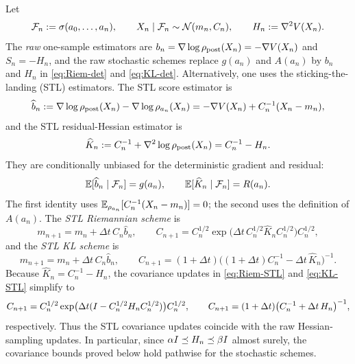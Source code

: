 Let
\[
    \mathcal{F}_n:=\sigma(a_0,\ldots,a_n),
    \qquad
    X_n\mid\mathcal{F}_n\sim\mathcal{N}(m_n,C_n),
    \qquad
    H_n:=\nabla^2V(X_n).
\]
The \emph{raw} one-sample estimators are
$b_n=\nabla\log\rho_{\mathrm{post}}(X_n)=-\nabla V(X_n)$ and $S_n=-H_n$, and the raw stochastic
schemes replace $g(a_n)$ and $A(a_n)$ by $b_n$ and $H_n$ in \eqref{eq:Riem-det} and
\eqref{eq:KL-det}. Alternatively, one uses the sticking-the-landing (STL) estimators. The
STL score estimator is
\begin{equation}
\label{eq:STL-score}
    \widehat b_n
    :=
    \nabla\log\rho_{\mathrm{post}}(X_n)-\nabla\log\rho_{a_n}(X_n)
    =
    -\nabla V(X_n)+C_n^{-1}(X_n-m_n),
\end{equation}
and the STL residual-Hessian estimator is
\begin{equation}
\label{eq:STL-residual}
    \widehat K_n
    :=
    C_n^{-1}+\nabla^2\log\rho_{\mathrm{post}}(X_n)
    =
    C_n^{-1}-H_n.
\end{equation}
They are conditionally unbiased for the deterministic gradient and residual:
\begin{equation}
\label{eq:STL-unbiased}
    \mathbb{E}[\widehat b_n\mid\mathcal{F}_n]=g(a_n),
    \qquad
    \mathbb{E}[\widehat K_n\mid\mathcal{F}_n]=R(a_n).
\end{equation}
The first identity uses $\mathbb{E}_{\rho_{a_n}}[C_n^{-1}(X_n-m_n)]=0$; the second uses the
definition of $A(a_n)$. The \emph{STL Riemannian scheme} is
\begin{equation}
\label{eq:Riem-STL}
    m_{n+1}=m_n+\Delta t\,C_n\widehat b_n,
    \qquad
    C_{n+1}
    =
    C_n^{1/2}\exp\bigl(\Delta t\,C_n^{1/2}\widehat K_nC_n^{1/2}\bigr)C_n^{1/2},
\end{equation}
and the \emph{STL KL scheme} is
\begin{equation}
\label{eq:KL-STL}
    m_{n+1}=m_n+\Delta t\,C_n\widehat b_n,
    \qquad
    C_{n+1}
    =
    (1+\Delta t)\bigl((1+\Delta t)C_n^{-1}-\Delta t\,\widehat K_n\bigr)^{-1}.
\end{equation}
Because $\widehat K_n=C_n^{-1}-H_n$, the covariance updates in \eqref{eq:Riem-STL} and
\eqref{eq:KL-STL} simplify to
\begin{equation}
\label{eq:STL-cov-simplify}
    C_{n+1}
    =
    C_n^{1/2}\exp\bigl(\Delta t(I-C_n^{1/2}H_nC_n^{1/2})\bigr)C_n^{1/2},
    \qquad
    C_{n+1}
    =
    (1+\Delta t)\bigl(C_n^{-1}+\Delta t\,H_n\bigr)^{-1},
\end{equation}
respectively. Thus the STL covariance updates coincide with the raw Hessian-sampling
updates. In particular, since $\alpha I\preceq H_n\preceq\beta I$ almost surely, the
covariance bounds proved below hold pathwise for the stochastic schemes.

